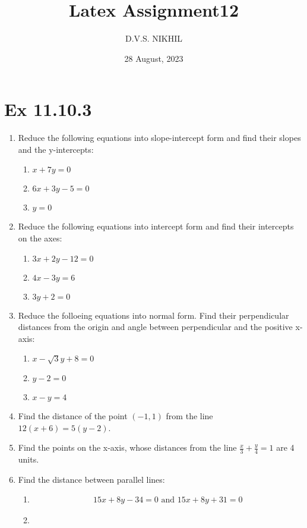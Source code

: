 \documentclass{article}
\theoremstyle{remark}
\begin{document}
\title{Latex Assignment12}
\author{D.V.S. NIKHIL}
\date{28 August, 2023}
\maketitle
\section*{Ex 11.10.3}
\begin{enumerate}
\item Reduce the following equations into slope-intercept form and find their slopes and the y-intercepts:
\begin{enumerate}[label=(\roman*)]
\item $x+7y=0$
\item $6x+3y-5=0$
\item $y=0$
\end{enumerate}
\item Reduce the following equations into intercept form and find their intercepts on the axes:
\begin{enumerate}[label=(\roman*)]
\item $3x+2y-12=0$
\item $4x-3y=6$
\item $3y+2=0$
\end{enumerate}
\item Reduce the folloeing equations into normal form. Find their perpendicular distances from the origin and angle between perpendicular and the positive x-axis:
\begin{enumerate}[label=(\roman*)]
\item $x-\sqrt3y+8=0$
\item $y-2=0$
\item $x-y=4$
\end{enumerate}
\item Find the distance of the point $(-1,1)$ from the line $12(x+6)=5(y-2)$.
\item Find the points on the x-axis, whose distances from the line $\frac{x}{3}+\frac{y}{4}=1$ are 4 units.
\item Find the distance between parallel lines:
\begin{enumerate}[label=(\roman*)]
           \item
 \begin{align}
        15x+8y-34=0 \text{ and } 15x+8y+31=0
              \end{align}
            \item
\begin{align}

\end{align}
\end{enumerate}
\end{enumerate}
\end{document}
